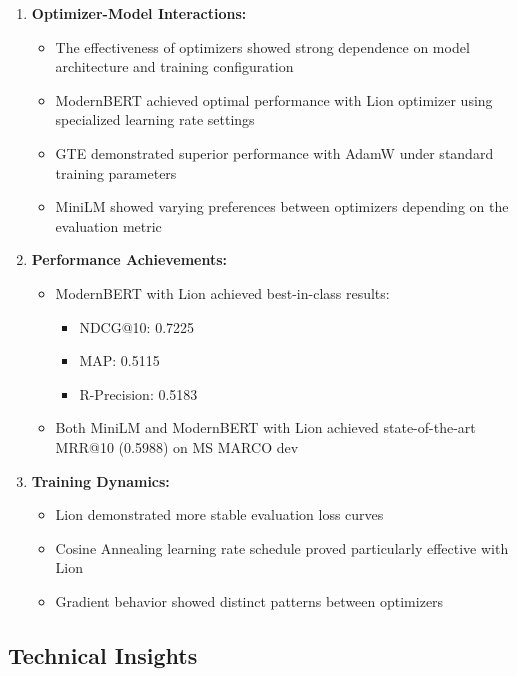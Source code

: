 \begin{enumerate}
    \item \textbf{Optimizer-Model Interactions:}
    \begin{itemize}
        \item The effectiveness of optimizers showed strong dependence on model architecture and training configuration
        \item ModernBERT achieved optimal performance with Lion optimizer using specialized learning rate settings
        \item GTE demonstrated superior performance with AdamW under standard training parameters
        \item MiniLM showed varying preferences between optimizers depending on the evaluation metric
    \end{itemize}

    \item \textbf{Performance Achievements:}
    \begin{itemize}
        \item ModernBERT with Lion achieved best-in-class results:
        \begin{itemize}
            \item NDCG@10: 0.7225
            \item MAP: 0.5115
            \item R-Precision: 0.5183
        \end{itemize}
        \item Both MiniLM and ModernBERT with Lion achieved state-of-the-art MRR@10 (0.5988) on MS MARCO dev
    \end{itemize}

    \item \textbf{Training Dynamics:}
    \begin{itemize}
        \item Lion demonstrated more stable evaluation loss curves
        \item Cosine Annealing learning rate schedule proved particularly effective with Lion
        \item Gradient behavior showed distinct patterns between optimizers
    \end{itemize}
\end{enumerate}

\subsection{Technical Insights}

